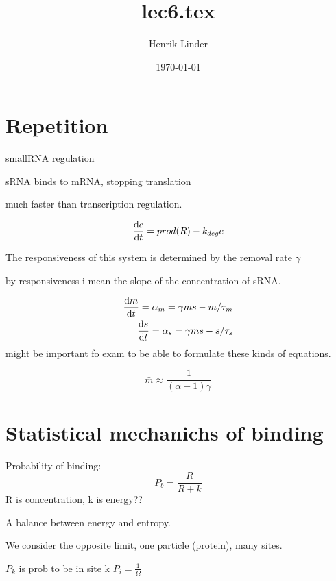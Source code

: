 \documentclass{article}
\title{lec6.tex }
\author{Henrik Linder}
\date{\today}
\begin{document}
\maketitle



\section{Repetition}
smallRNA regulation 

sRNA binds to mRNA, stopping translation 

much faster than transcription regulation. 

\begin{equation}
	\dv {c}{t} = prod(R) - k_{deg}c
\end{equation}


The responsiveness of this system is determined by the removal rate $\gamma$

by responsiveness i mean the slope of the concentration of sRNA. 

\begin{equation}
	\begin{split}
	\dv {m}{t} = \alpha_m = \gamma m s - m/\tau_m\\
	\dv {s}{t} = \alpha_s = \gamma m s - s/\tau_s\\
	\end{split}
\end{equation}
might be important fo exam to be able to formulate these kinds of equations. 




\begin{equation}
	\bar m \approx \frac{1}{(\alpha -1)\gamma}
\end{equation}


\section{Statistical mechanichs of binding}

Probability of binding: 
\begin{equation}
	P_b = \frac{R}{R+k}
\end{equation}
R is concentration, k is energy??

A balance between energy and entropy. 

We consider the opposite limit, one particle (protein), many sites. 


$P_k$ is prob to be in site k 
$P_i = \frac{1}{\Omega}$ 
\end{document}
